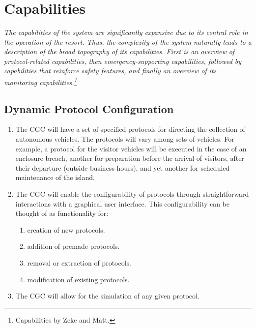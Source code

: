 \documentclass[12pt]{article}
\begin{document}
\section{Capabilities}
\label{cap}
\paragraph{}\textit{The capabilities of the system are significantly expansive due to its central role
in the operation of the resort. Thus, the complexity of the system naturally leads to a description
of the broad topography of its capabilities. First is an overview of protocol-related capabilities, then
emergency-supporting capabilities, followed by capabilities that reinforce safety features, and finally an 
overview of its monitoring capabilities.\footnote {Capabilities by Zeke and Matt.}}
	\subsection{Dynamic Protocol Configuration}
	\begin{enumerate}
		\item The CGC will have a set of specified protocols for directing the collection 
		of autonomous vehicles. The protocols will vary among sets of vehicles. For example, 
		a protocol for the visitor vehicles will be executed in the case of an enclosure 
		breach, another for preparation before the arrival of visitors, after their departure 
		(outside business hours), and yet another for scheduled maintenance of the island.
		\item The CGC will enable the configurability of protocols through straightforward 
		interactions with a graphical user interface. This configurability can be thought of
		as functionality for:
		\begin{enumerate}
			\item creation of new protocols.
			\item addition of premade protocols.
			\item removal or extraction of protocols.
			\item modification of existing protocols.
		\end{enumerate}
		\item The CGC will allow for the simulation of any given protocol.
	\end{enumerate}
	
\end{document}
